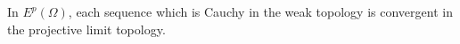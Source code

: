 In $E^p(\Omega)$, each sequence which is Cauchy in the weak topology is convergent in the projective limit topology.

